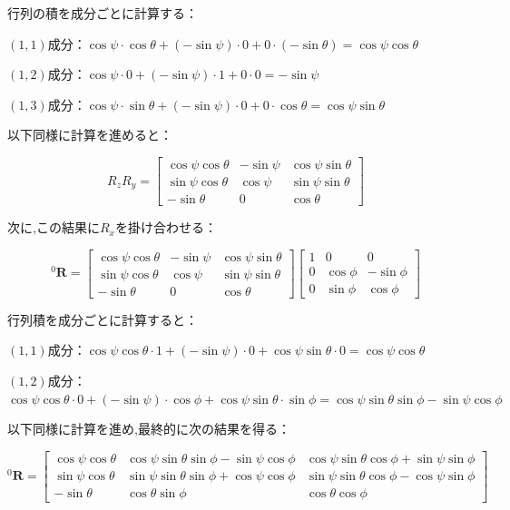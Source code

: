 行列の積を成分ごとに計算する：

$(1,1)$成分：$\cos \psi \cdot \cos \theta + (-\sin \psi) \cdot 0 + 0 \cdot (-\sin \theta) = \cos \psi \cos \theta$

$(1,2)$成分：$\cos \psi \cdot 0 + (-\sin \psi) \cdot 1 + 0 \cdot 0 = -\sin \psi$

$(1,3)$成分：$\cos \psi \cdot \sin \theta + (-\sin \psi) \cdot 0 + 0 \cdot \cos \theta = \cos \psi \sin \theta$

以下同様に計算を進めると：

\[
  R_z R_y = \begin{bmatrix} 
    \cos \psi \cos \theta & -\sin \psi & \cos \psi \sin \theta \\ 
    \sin \psi \cos \theta & \cos \psi  & \sin \psi \sin \theta \\ 
    -\sin \theta          & 0          & \cos \theta 
  \end{bmatrix}
\]

次に,この結果に$R_x$を掛け合わせる：

\[
  ^0\mathbf{R} = \begin{bmatrix} 
    \cos \psi \cos \theta & -\sin \psi & \cos \psi \sin \theta \\ 
    \sin \psi \cos \theta & \cos \psi  & \sin \psi \sin \theta \\ 
    -\sin \theta          & 0          & \cos \theta 
  \end{bmatrix}
  \begin{bmatrix} 
    1 & 0         & 0          \\ 
    0 & \cos \phi & -\sin \phi \\ 
    0 & \sin \phi & \cos \phi 
  \end{bmatrix}
\]

行列積を成分ごとに計算すると：

$(1,1)$成分：$\cos \psi \cos \theta \cdot 1 + (-\sin \psi) \cdot 0 + \cos \psi \sin \theta \cdot 0 = \cos \psi \cos \theta$

$(1,2)$成分：$\cos \psi \cos \theta \cdot 0 + (-\sin \psi) \cdot \cos \phi + \cos \psi \sin \theta \cdot \sin \phi = \cos \psi \sin \theta \sin \phi - \sin \psi \cos \phi$

以下同様に計算を進め,最終的に次の結果を得る：

\[
  ^0\mathbf{R} = 
  \begin{bmatrix} 
    \cos \psi \cos \theta & \cos \psi \sin \theta \sin \phi - \sin \psi \cos \phi & \cos \psi \sin \theta \cos \phi + \sin \psi \sin \phi \\ 
    \sin \psi \cos \theta & \sin \psi \sin \theta \sin \phi + \cos \psi \cos \phi & \sin \psi \sin \theta \cos \phi - \cos \psi \sin \phi \\ 
    - \sin \theta         & \cos \theta \sin \phi                                 & \cos \theta \cos \phi 
  \end{bmatrix} \tag{2.17}
\]


